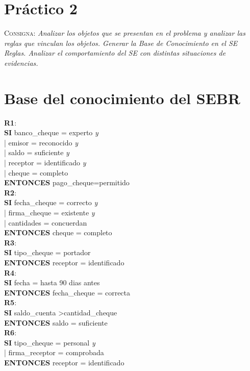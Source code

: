 \documentclass{article}
\begin{document}
\section{Práctico 2}
\textsc{Consigna}: \textit{Analizar los objetos que se presentan en el problema
y analizar las reglas que vinculan los objetos. Generar la Base de Conocimiento
en el SE Reglas. Analizar el comportamiento del SE con distintas situaciones de
evidencias.}
\\

\section{Base del conocimiento del SEBR}
\textbf{R1}: \\
	\textbf{SI} banco\_cheque = experto \textit{y} \\
	|    emisor = reconocido \textit{y} \\
	|    saldo = suficiente \textit{y} \\
	|    receptor = identificado \textit{y} \\
	|    cheque = completo \\
	\textbf{ENTONCES} pago\_cheque=permitido \\

\textbf{R2}:\\
	\textbf{SI}
	fecha\_cheque = correcto \textit{y}\\
	|    firma\_cheque = existente \textit{y}\\
	|    cantidades = concuerdan\\
	\textbf{ENTONCES}	cheque = completo\\

\textbf{R3}:\\
	\textbf{SI}
	tipo\_cheque = portador\\
	\textbf{ENTONCES}	receptor = identificado\\

\textbf{R4}:\\
	\textbf{SI}
	fecha = hasta 90 dias antes\\
	\textbf{ENTONCES}	fecha\_cheque = correcta\\

\textbf{R5}:\\
	\textbf{SI}
	saldo\_cuenta \textgreater  cantidad\_cheque\\
	\textbf{ENTONCES}	saldo = suficiente\\

\textbf{R6}:\\
	\textbf{SI}
	tipo\_cheque = personal \textit{y}\\
	|    firma\_receptor = comprobada \\
	\textbf{ENTONCES}	receptor = identificado\\
\end{document}
